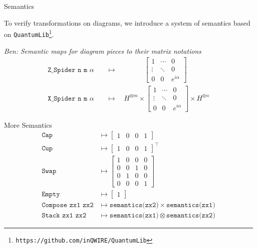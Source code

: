 \documentclass{beamer}
\newcommand{\QLib}{\texttt{QuantumLib}\xspace}
\newcommand{\ben}[1]{\textit{\textcolor{egreen}{Ben: #1}}}
\newcommand{\ben}[1]{}
\begin{document}
\begin{frame}{Semantics}

  To verify transformations on diagrams, we introduce a \alert{system of semantics} based on \QLib\footnote{\texttt{https://github.com/inQWIRE/QuantumLib}}.
    
    \ben{Semantic maps for diagram pieces to their matrix notations}
    \begin{align*}
        \texttt{Z_Spider n m }\alpha \quad &\mapsto \hspace{47pt}
        \begin{bmatrix} 
            1 & \dotsi & 0 \\ 
            \vdots & \ddots & 0 \\ 
            0 & 0 & e^{i\alpha}
        \end{bmatrix}
    \\
    \texttt{X_Spider n m }\alpha  \quad &\mapsto \quad H^{\otimes m} \times 
        \begin{bmatrix} 
            1 & \dotsi & 0 \\ 
            \vdots & \ddots & 0 \\ 
            0 & 0 & e^{i\alpha}
        \end{bmatrix} \times H^{\otimes n}
    \end{align*}
\end{frame}
    
\begin{frame}{More Semantics}
    \begin{align*}
        \texttt{Cap} &\mapsto 
        \begin{bmatrix} 
            1 & 0 & 0 & 1
        \end{bmatrix}
    \\
        \texttt{Cup} &\mapsto 
        \begin{bmatrix} 
            1 & 0 & 0 & 1
        \end{bmatrix}^\top
    \\
        \texttt{Swap} &\mapsto
        \begin{bmatrix}
            1 & 0 & 0 & 0 \\
            0 & 0 & 1 & 0 \\
            0 & 1 & 0 & 0 \\
            0 & 0 & 0 & 1
        \end{bmatrix}
    \\
        \texttt{Empty} &\mapsto
        \begin{bmatrix}
            1
        \end{bmatrix}
    \\
        \texttt{Compose zx1 zx2} &\mapsto 
        \texttt{semantics(zx2)} \times \texttt{semantics(zx1)}
    \\
        \texttt{Stack zx1 zx2} &\mapsto
        \texttt{semantics(zx1)} \otimes \texttt{semantics(zx2)}
    \end{align*}
\end{frame}
\end{document}

